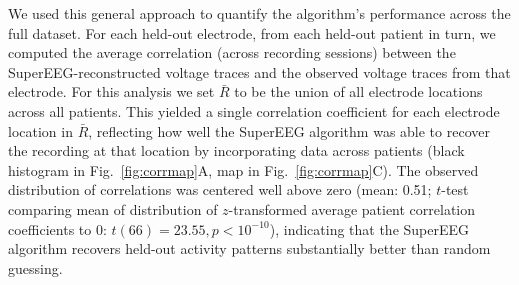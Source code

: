 \documentclass[11pt]{article}
\begin{document}
We used this general approach to quantify the algorithm's performance
across the full dataset. For each held-out electrode, from each
held-out patient in turn, we computed the average correlation (across
recording sessions) between the SuperEEG-reconstructed voltage traces
and the observed voltage traces from that electrode.  For this
analysis we set $\bar{R}$ to be the union of all electrode locations
across all patients.  This yielded a single correlation coefficient
for each electrode location in $\bar{R}$, reflecting how well the
SuperEEG algorithm was able to recover the recording at that location
by incorporating data across patients (black histogram in
Fig.~\ref{fig:corrmap}A, map in Fig.~\ref{fig:corrmap}C).  The
observed distribution of correlations was centered well above zero
(mean: 0.51; $t$-test comparing mean of distribution of
$z$-transformed average patient correlation coefficients to 0:
$t(66) = 23.55, p < 10^{-10}$), indicating that the SuperEEG algorithm
recovers held-out activity patterns substantially better than random
guessing.
\end{document}
